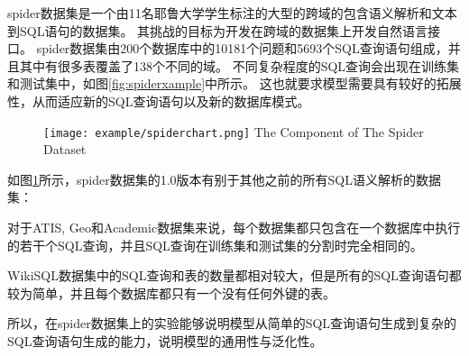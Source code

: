 spider数据集是一个由11名耶鲁大学学生标注的大型的跨域的包含语义解析和文本到SQL语句的数据集。
其挑战的目标为开发在跨域的数据集上开发自然语言接口。
spider数据集由200个数据库中的10181个问题和5693个SQL查询语句组成，并且其中有很多表覆盖了138个不同的域。
不同复杂程度的SQL查询会出现在训练集和测试集中，如图\ref{fig:spiderxample}中所示。
这也就要求模型需要具有较好的拓展性，从而适应新的SQL查询语句以及新的数据库模式。

\begin{figure}[!htp]
  \centering
  \texttt{[image: example/spiderchart.png]}
    {The Component of The Spider Dataset}
  \label{fig:spiderchart}
\end{figure}

如图\ref{fig:spiderchart}所示，spider数据集的1.0版本有别于其他之前的所有SQL语义解析的数据集：

\begin{itemize*}
  \item 对于ATIS, Geo和Academic数据集来说，每个数据集都只包含在一个数据库中执行的若干个SQL查询，并且SQL查询在训练集和测试集的分割时完全相同的。
  
  \item WikiSQL数据集中的SQL查询和表的数量都相对较大，但是所有的SQL查询语句都较为简单，并且每个数据库都只有一个没有任何外键的表。  
\end{itemize*}

所以，在spider数据集上的实验能够说明模型从简单的SQL查询语句生成到复杂的SQL查询语句生成的能力，说明模型的通用性与泛化性。

